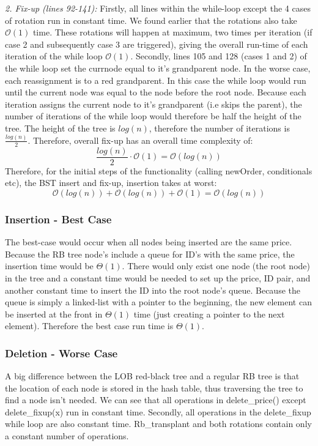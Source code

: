 \documentclass[11p]{article}
\def\nl{\newline}
\begin{document}
\textit{2. Fix-up (lines 92-141):} \nl
Firstly, all lines within the while-loop except the 4 cases of rotation run in constant time. We found earlier that the rotations also take $\mathcal{O}(1)$ time.  These rotations will happen at maximum, two times per iteration (if case 2 and subsequently case 3 are triggered), giving the overall run-time of each iteration of the while loop $\mathcal{O}(1)$. \nl
Secondly, lines 105 and 128 (cases 1 and 2) of the while loop set the currnode equal to it's grandparent node. In the worse case, each reassignment is to a red grandparent. In this case the while loop would run until the current node was equal to the node before the root node. Because each iteration assigns the current node to it's grandparent (i.e skips the parent), the number of iterations of the while loop would therefore be half the height of the tree. The height of the tree is $log(n)$, therefore the number of iterations is $\frac{log(n)}{2}$. Therefore, overall fix-up has an overall time complexity of: $$\frac{log(n)}{2} \cdot \mathcal{O}(1) = \mathcal{O}(log(n))$$ \nl
Therefore, for the initial steps of the functionality (calling newOrder, conditionals etc), the BST insert and fix-up, insertion takes at worst:
$$\mathcal{O}(log(n)) + \mathcal{O}(log(n)) + \mathcal{O}(1) = \mathcal{O}(log(n))$$




\subsubsection{Insertion - Best Case}
The best-case would occur when all nodes being inserted are the same price. Because the RB tree node's include a queue for ID's with the same price, the insertion time would be $\Theta(1)$. There would only exist one node (the root node) in the tree and a constant time would be needed to set up the price, ID pair, and another constant time to insert the ID into the root node's queue. Because the queue is simply a linked-list with a pointer to the beginning, the new element can be inserted at the front in $\Theta(1)$ time (just creating a pointer to the next element). Therefore the best case run time is $\Theta(1)$.


\subsubsection{Deletion - Worse Case}
A big difference between the LOB red-black tree and a regular RB tree is that the location of each node is stored in the hash table, thus traversing the tree to find a node isn't needed. We can see that all operations in delete\_price() except delete\_fixup(x) run in constant time. Secondly, all operations in the delete\_fixup while loop are also constant time. Rb\_transplant and both rotations contain only a constant number of operations. \nl
\end{document}
